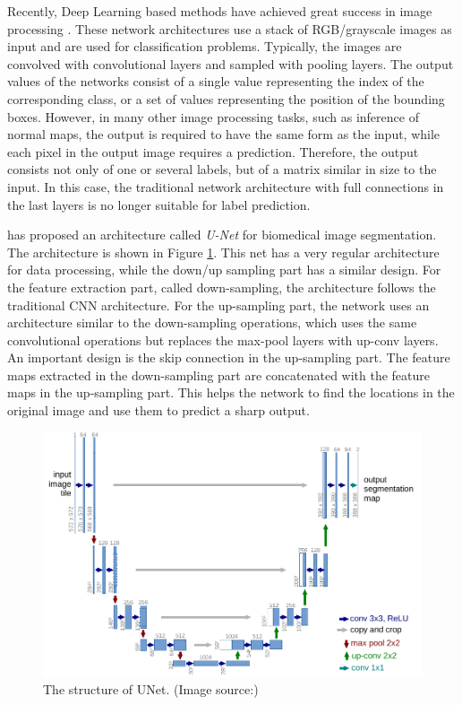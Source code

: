 Recently, Deep Learning based methods have achieved great success in image processing\cite{yolov3} \cite{efficientDet}. These network architectures use a stack of RGB/grayscale images as input and are used for classification problems. Typically, the images are convolved with convolutional layers and sampled with pooling layers. The output values of the networks consist of a single value representing the index of the corresponding class, or a set of values representing the position of the bounding boxes\cite{yolov3}. However, in many other image processing tasks, such as inference of normal maps, the output is required to have the same form as the input, while each pixel in the output image requires a prediction. Therefore, the output consists not only of one or several labels, but of a matrix similar in size to the input. In this case, the traditional network architecture with full connections in the last layers is no longer suitable for label prediction.

\cite{unet} has proposed an architecture called \textit{U-Net} for biomedical image segmentation. The architecture is shown in Figure \ref{fig:u-net}. This net has a very regular architecture for data processing, while the down/up sampling part has a similar design. For the feature extraction part, called down-sampling, the architecture follows the traditional CNN architecture. For the up-sampling part, the network uses an architecture similar to the down-sampling operations, which uses the same convolutional operations but replaces the max-pool layers with up-conv layers. An important design is the skip connection in the up-sampling part. The feature maps extracted in the down-sampling part are concatenated with the feature maps in the up-sampling part. This helps the network to find the locations in the original image and use them to predict a sharp output.

\begin{figure}[th]
	\centering
	\captionsetup{width=\linewidth}
	\includegraphics[width=\textwidth]{./Figures/u-net-illustration-correct-scale2.pdf}
	\decoRule
	\caption{The structure of UNet. (Image source:\cite{unet})}
	\label{fig:u-net}
\end{figure}

